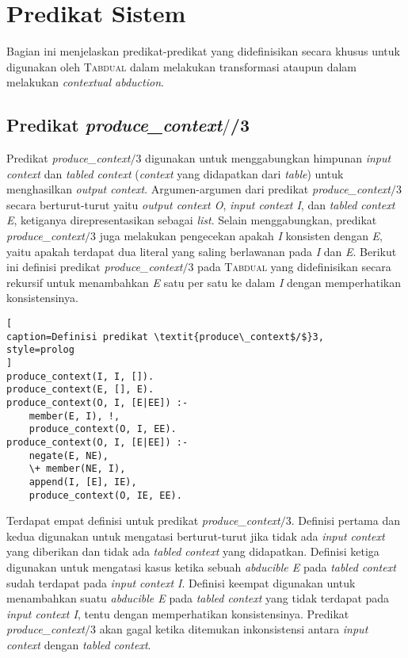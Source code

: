 \section{Predikat Sistem}

Bagian ini menjelaskan predikat-predikat yang didefinisikan secara khusus untuk digunakan oleh \textsc{Tabdual} dalam melakukan transformasi ataupun dalam melakukan \textit{contextual abduction}.

\subsection{Predikat \textit{produce\_context$/$}/3}

Predikat \textit{produce\_context$/$}3 digunakan untuk menggabungkan himpunan \textit{input context} dan \textit{tabled context} (\textit{context} yang didapatkan dari \textit{table}) untuk menghasilkan \textit{output context}. Argumen-argumen dari predikat \textit{produce\_context$/$}3 secara berturut-turut yaitu \textit{output context O}, \textit{input context I}, dan \textit{tabled context E}, ketiganya direpresentasikan sebagai \textit{list}. Selain menggabungkan, predikat \textit{produce\_context$/$}3 juga melakukan pengecekan apakah \textit{I} konsisten dengan \textit{E}, yaitu apakah terdapat dua literal yang saling berlawanan pada \textit{I} dan \textit{E}. Berikut ini definisi predikat \textit{produce\_context$/$}3 pada \textsc{Tabdual} yang didefinisikan secara rekursif untuk menambahkan \textit{E} satu per satu ke dalam \textit{I} dengan memperhatikan konsistensinya.
\\

\begin{lstlisting}[
caption=Definisi predikat \textit{produce\_context$/$}3,
style=prolog
]
produce_context(I, I, []).
produce_context(E, [], E).
produce_context(O, I, [E|EE]) :-
	member(E, I), !,
	produce_context(O, I, EE).
produce_context(O, I, [E|EE]) :-
	negate(E, NE),
	\+ member(NE, I),
	append(I, [E], IE),
	produce_context(O, IE, EE).
\end{lstlisting}

Terdapat empat definisi untuk predikat \textit{produce\_context$/$}3. Definisi pertama dan kedua digunakan untuk mengatasi berturut-turut jika tidak ada \textit{input context} yang diberikan dan tidak ada \textit{tabled context} yang didapatkan. Definisi ketiga digunakan untuk mengatasi kasus ketika sebuah \textit{abducible E} pada \textit{tabled context} sudah terdapat pada \textit{input context I}. Definisi keempat digunakan untuk menambahkan suatu \textit{abducible E} pada \textit{tabled context} yang tidak terdapat pada \textit{input context I}, tentu dengan memperhatikan konsistensinya. Predikat \textit{produce\_context$/$}3 akan gagal ketika ditemukan inkonsistensi antara \textit{input context} dengan \textit{tabled context}.

